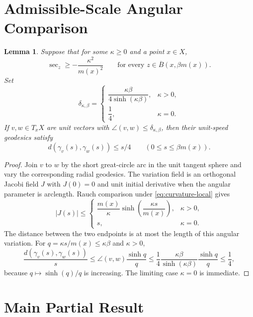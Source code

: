 \documentclass[11pt]{article}
\newtheorem{lemma}{Lemma}
\begin{document}
\section*{Admissible-Scale Angular Comparison}

\begin{lemma}\label{lem:angular}
Suppose that for some $\kappa\geq0$ and a point $x\in X$,
\begin{equation}\label{eq:curvature-local}
 \sec_z\geq-\frac{\kappa^2}{m(x)^2}
 \qquad\text{for every }z\in \overline B(x,\beta m(x)).
\end{equation}
Set
\begin{equation}\label{eq:delta}
 \delta_{\kappa,\beta}=
 \begin{cases}
 \dfrac{\kappa\beta}{4\sinh(\kappa\beta)},&\kappa>0,\\[6pt]
 \dfrac14,&\kappa=0.
 \end{cases}
\end{equation}
If $v,w\in T_xX$ are unit vectors with
$\angle(v,w)\leq\delta_{\kappa,\beta}$, then their unit-speed geodesics
satisfy
\[
 d(\gamma_v(s),\gamma_w(s))\leq s/4
 \qquad(0\leq s\leq\beta m(x)).
\]
\end{lemma}

\begin{proof}
Join $v$ to $w$ by the short great-circle arc in the unit tangent sphere and
vary the corresponding radial geodesics.  The variation field is an
orthogonal Jacobi field $J$ with $J(0)=0$ and unit initial derivative when
the angular parameter is arclength.  Rauch comparison under
\eqref{eq:curvature-local} gives
\[
 |J(s)|\leq
 \begin{cases}
 \dfrac{m(x)}{\kappa}\sinh\!\left(\dfrac{\kappa s}{m(x)}\right),&\kappa>0,\\[6pt]
 s,&\kappa=0.
 \end{cases}
\]
The distance between the two endpoints is at most the length of this
angular variation.  For $q=\kappa s/m(x)\leq\kappa\beta$ and $\kappa>0$,
\[
 \frac{d(\gamma_v(s),\gamma_w(s))}{s}
 \leq \angle(v,w)\frac{\sinh q}{q}
 \leq \frac14\frac{\kappa\beta}{\sinh(\kappa\beta)}
                 \frac{\sinh q}{q}
 \leq\frac14,
\]
because $q\mapsto\sinh(q)/q$ is increasing.  The limiting case
$\kappa=0$ is immediate.
\end{proof}

\section*{Main Partial Result}
\end{document}
